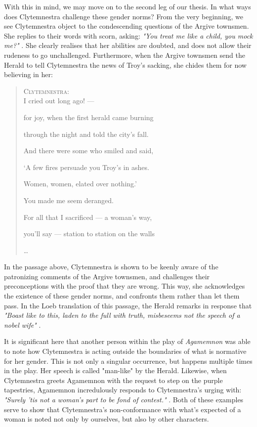 With this in mind, we may move on to the second leg of our thesis. In what ways
does Clytemnestra challenge these gender norms? From the very beginning, we see
Clytemnestra object to the condescending questions of the Argive townsmen. She
replies to their words with scorn, asking: \emph{"You treat me like a child,
you mock me?"} \autocite[275]{Fagles}. She clearly realises that her abilities
are doubted, and does not allow their rudeness to go unchallenged. Furthermore,
when the Argive townsmen send the Herald to tell Clytemnestra the news of Troy's
sacking, she chides them for now believing in her:

\begin{quote}
  \textsc{Clytemnestra}: \\
  I cried out long ago! ---

  for joy, when the first herald came burning

  through the night and told the city's fall.

  And there were some who smiled and said,

  `A few fires persuade you Troy's in ashes.

  Women, women, elated over nothing.'

  You made me seem deranged.

  For all that I sacrificed --- a woman's way,

  you'll say --- station to station on the walls

  \ldots\

  \autocite[580]{Fagles}
\end{quote}

\noindent
In the passage above, Clytemnestra is shown to be keenly aware of the
patronizing comments of the Argive townsmen, and challenges their preconceptions
with the proof that they are wrong. This way, she acknowledges the existence of
these gender norms, and confronts them rather than let them pass. In the Loeb
translation of this passage, the Herald remarks in response that \emph{"Boast
like to this, laden to the full with truth, misbeseems not the speech of a
nobel wife"} \autocite[613]{loeb}.

\noindent
It is significant here that another person within the play of \emph{Agamemnon}
was able to note how Clytemnestra is acting outside the boundaries of what is
normative for her gender. This is not only a singular occurrence, but happens
multiple times in the play. Her speech is called "man-like" by the Herald.
Likewise, when Clytemnestra greets Agamemnon with the request to step on the
purple tapestries, Agamemnon incredulously responds to Clytemnestra's urging
with: \emph{"Surely 'tis not a woman's part to be fond of contest."}
\autocite[940]{loeb}. Both of these examples serve to show that Clytemnestra's
non-conformance with what's expected of a woman is noted not only by ourselves,
but also by other characters.

